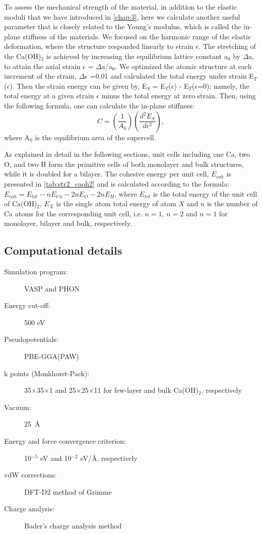 To assess the mechanical strength of the material, in addition to the elastic moduli that we have introduced in \autoref{chap:3}, here we calculate another useful parameter that is closely related to the Young's modulus, which is called the in-plane stiffness of the materials. We 
focused on the harmonic range of the elastic deformation, where the structure 
responded linearly to strain $\epsilon$. The stretching of the Ca(OH)$_{2}$ is 
achieved by increasing the equilibrium lattice constant a$_{0}$ by $\Delta$a, 
to attain the axial strain $\epsilon$ = $\Delta$a/a$_{0}$. We optimized the 
atomic structure at each increment of the strain, $\Delta\epsilon$ =0.01 and 
calculated the total energy under strain E$_{T}$($\epsilon$). Then the strain 
energy can be given by, E$_{S}$ = E$_{T}$($\epsilon$) - E$_{T}$($\epsilon$=0); 
namely, the total energy at a given strain $\epsilon$ minus the total energy at 
zero strain. Then, using the following formula, one can calculate the in-plane 
stiffness: 
\begin{equation}
 C = (\dfrac{1}{A_{0}})(\dfrac{d^{2}E_{S}}{d\epsilon^{2}}),
\end{equation}
where A$_{0}$ is the equilibrium area of the supercell.

As explained in detail in the following sections, unit cells including one Ca,
two O, and two H form the primitive cells of both monolayer and bulk structures, 
while it is doubled for a bilayer. The cohesive energy per unit cell,
$E_{coh}$ is presented in \autoref{tab:str2_caoh2} and is calculated according to the formula:
$E_{coh}=E_{tot}-nE_{Ca}-2nE_O-2nE_H$, where $E_{tot}$ is the total energy
of the unit cell of Ca(OH)$_2$, $E_X$ is the single atom total energy of atom $X$
and $n$ is the number of Ca atoms for the corresponding unit cell, i.e.
$n=1$, $n=2$ and $n=1$ for monolayer, bilayer and bulk, respectively. 

\subsection{Computational details}

\begin{footnotesize}
\begin{description}
\item[Simulation program:] VASP and PHON\cite{alfe}
\item[Energy cut-off:] 500 eV
\item[Pseudopotentials:] PBE-GGA(PAW)
\item[k points (Monkhorst-Pack):] 35$\times$35$\times$1 and 25$\times$25$\times$11 for few-layer and bulk Ca(OH)$_{2}$, respectively 
\item[Vacuum:] 25~\AA
\item[Energy and force convergence criterion:] 10$^{-5}$ eV and 10$^{-2}$ eV/\AA, respectively
\item[vdW corrections:] DFT-D2 method of Grimme \cite{Grimme}
\item[Charge analysis:] Bader's charge analysis method\cite{Bader1,Bader2,Bader3}
\end{description}
\end{footnotesize}



